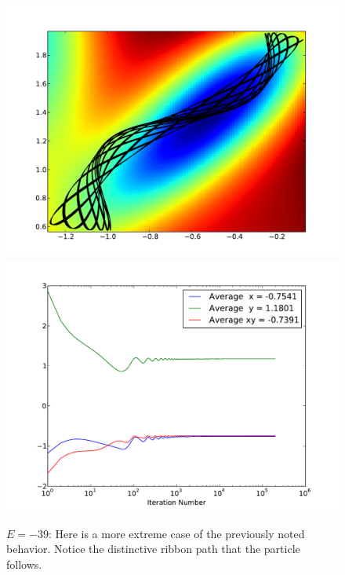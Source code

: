 \documentclass[letterpaper]{article}
\begin{document}
\begin{figure}[p]
\begin{center}
\includegraphics[width=5in]{t6.pdf}
\includegraphics[width=5in]{t6a.pdf}
\end{center}
\caption{$E=-39$: Here is a more extreme case of the previously noted behavior.
Notice the distinctive ribbon path that the particle follows.}
\label{fig:t6}
\end{figure}
\end{document}
